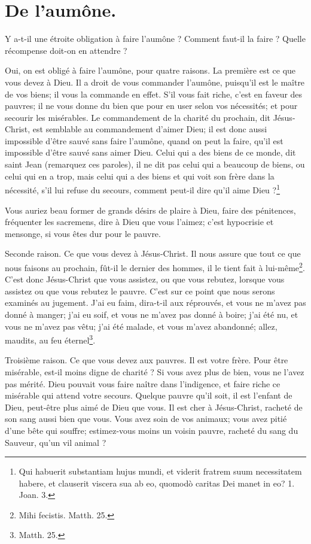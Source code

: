 \documentclass[instructions.tex]{subfiles}
\begin{document}
 
\chapter{De l'aumône.}
 
Y a-t-il une étroite obligation à faire l'aumône ? Comment faut-il la faire ? Quelle récompense doit-on en attendre ?
 
\primo Oui, on est obligé à faire l'aumône, pour quatre raisons. La première est ce que vous devez à Dieu. Il a droit de vous commander l'aumône, puisqu'il est le maître de vos biens; il vous la commande en effet. S'il vous fait riche, c'est en faveur des pauvres; il ne vous donne du bien que pour en user selon vos nécessités; et pour secourir les misérables. Le commandement de la charité du prochain, dit Jésus-Christ, est semblable au commandement d'aimer Dieu; il est donc aussi impossible d'être sauvé sans faire l'aumône, quand on peut la faire, qu'il est impossible d'être sauvé sans aimer Dieu. Celui qui a des biens de ce monde, dit saint Jean (remarquez ces paroles), il ne dit pas celui qui a beaucoup de biens, ou celui qui en a trop, mais celui qui a des biens et qui voit son frère dans la nécessité, s'il lui refuse du secours, comment peut-il dire qu'il aime Dieu ?\footnote{Qui habuerit substantiam hujus mundi, et viderit fratrem suum necessitatem habere, et clauserit viscera sua ab eo, quomodò caritas Dei manet in eo? 1. Joan. 3.}
 
Vous auriez beau former de grands désirs de plaire à Dieu, faire des pénitences, fréquenter les sacremens, dire à Dieu que vous l'aimez; c'est hypocrisie et mensonge, si vous êtes dur pour le pauvre.
 
Seconde raison. Ce que vous devez à Jésus-Christ. Il nous assure que tout ce que nous faisons au prochain, fût-il le dernier des hommes, il le tient fait à lui-même\footnote{Mihi fecistis. Matth. 25.}. C'est donc Jésus-Christ que vous assistez, ou que vous rebutez, lorsque vous assistez ou que vous rebutez le pauvre. C'est sur ce point que nous serons examinés au jugement. J'ai eu faim, dira-t-il aux réprouvés, et vous ne m'avez pas donné à manger; j'ai eu soif, et vous ne m'avez pas donné à boire; j'ai été nu, et vous ne m'avez pas vêtu; j'ai été malade, et vous m'avez abandonné; allez, maudits, au feu éternel\footnote{ Matth. 25.}.
 
Troisième raison. Ce que vous devez aux pauvres. Il est votre frère. Pour être misérable, est-il moins digne de charité ? Si vous avez plus de bien, vous ne l'avez pas mérité. Dieu pouvait vous faire naître dans l'indigence, et faire riche ce misérable qui attend votre secours. Quelque pauvre qu'il soit, il est l'enfant de Dieu, peut-être plus aimé de Dieu que vous. Il est cher à Jésus-Christ, racheté de son sang aussi bien que vous. Vous avez soin de vos animaux; vous avez pitié d'une bête qui souffre; estimez-vous moins un voisin pauvre, racheté du sang du Sauveur, qu'un vil animal ?
 
\end{document}
